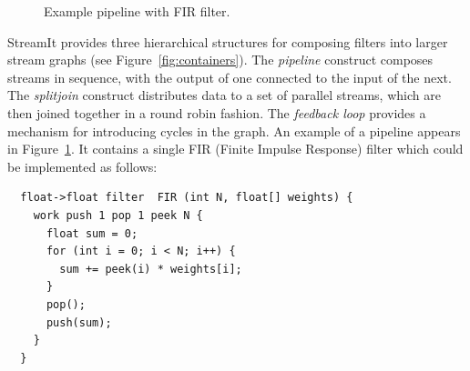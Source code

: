\documentclass[11pt, letterpaper, onecolumn]{article}
\begin{document}
\begin{figure}[t]
\begin{center}
  \caption{Example pipeline with FIR filter.}
  \label{fig:pipeline}
\end{center}
\end{figure}

StreamIt provides three  hierarchical structures for composing filters
into larger stream graphs (see Figure~\ref{fig:containers}).  The {\it
pipeline} construct  composes streams in sequence, with  the output of
one connected to the input of the next.  The {\it splitjoin} construct
distributes data to  a set of parallel streams,  which are then joined
together in a round robin fashion.   The {\it feedback loop} provides a
mechanism  for introducing  cycles  in  the graph.   An  example of  a
pipeline  appears  in  Figure~\ref{fig:pipeline}.  It  contains  a
single  FIR   (Finite  Impulse   Response)  filter which   could  be
implemented as follows:
\vspace{-12pt}
\begin{singlespace}
\begin{verbatim}
  float->float filter  FIR (int N, float[] weights) {
    work push 1 pop 1 peek N {
      float sum = 0;
      for (int i = 0; i < N; i++) {
        sum += peek(i) * weights[i];
      }
      pop();
      push(sum);
    }
  }
\end{verbatim}
\end{singlespace}
\end{document}
